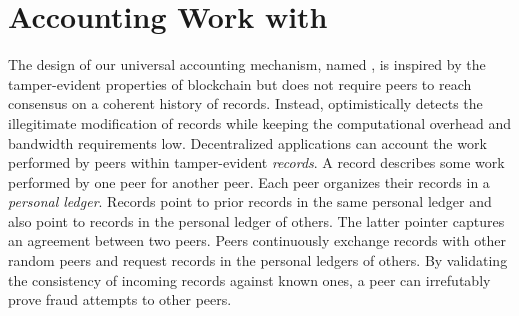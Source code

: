 
\section{Accounting Work with \TrustChain{}}
\label{sec:micro_accounting}
The design of our universal accounting mechanism, named \emph{\TrustChain{}}, is inspired by the tamper-evident properties of blockchain but does not require peers to reach consensus on a coherent history of records.
Instead, \TrustChain{} optimistically detects the illegitimate modification of records while keeping the computational overhead and bandwidth requirements low.
Decentralized applications can account the work performed by peers within tamper-evident \emph{records}.
A record describes some work performed by one peer for another peer.
Each peer organizes their records in a \emph{personal ledger}.
Records point to prior records in the same personal ledger and also point to records in the personal ledger of others.
The latter pointer captures an agreement between two peers.
Peers continuously exchange records with other random peers and request records in the personal ledgers of others.
By validating the consistency of incoming records against known ones, a peer can irrefutably prove fraud attempts to other peers.

